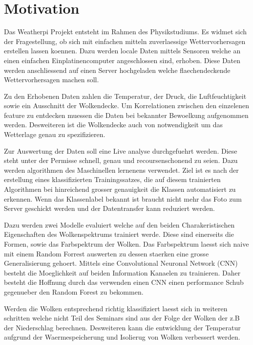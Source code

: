\section{Motivation}
\label{sec:Motivation}

Das Weatherpi Projekt entsteht im Rahmen des Physikstudiums.
Es widmet sich der Fragestellung, ob sich mit einfachen mitteln zuverlaessige
Wettervorhersagen erstellen lassen koennen.
Dazu werden locale Daten mittels Sensoren welche an einen einfachen Einplatinencomputer
angeschlossen sind, erhoben.
Diese Daten werden anschliessend auf einen Server hochgeladen welche
flaechendeckende Wettervorhersagen machen soll. \par
Zu den Erhobenen Daten zahlen die Temperatur, der Druck, die Luftfeuchtigkeit
sowie ein Ausschnitt der Wolkendecke.
Um Korrelationen zwischen den einzelenen feature zu entdecken muessen die Daten
bei bekannter Bewoelkung aufgenommen werden.
Desweiteren ist die Wolkendecke auch von notwendigkeit um das Wetterlage genau
zu spezifizieren.  \par
Zur Auswertung der Daten soll eine Live analyse durchgefuehrt werden. 
Diese steht unter der Permisse schnell, genau und recoursenschonend zu seien.
Dazu werden algorithmen des Maschinellen lernenens verwendet. 
Ziel ist es nach der erstellung eines klassifizierten Trainingssatzes, die auf
diesem trainierten Algorithmen bei hinreichend grosser genauigkeit die Klassen
automatisiert zu erkennen.
Wenn das Klassenlabel bekannt ist braucht nicht mehr das Foto zum Server
geschickt werden und der Datentransfer kann reduziert werden. \par
Dazu werden zwei Modelle evaluiert welche auf den beiden Charakeristischen
Eigenschaften des Wolkenspektrums trainiert werde. 
Diese sind einerseits die Formen, sowie das Farbspektrum der Wolken.
Das Farbspektrum laesst sich naive mit einem Random Forrest auswerten zu dessen
staerken eine grosse Generalisierung gehoert. 
Mittels eine Convolutional Neuronal Network (CNN) besteht die Moeglichkeit auf
beiden Information Kanaelen zu trainieren. 
Daher besteht die Hoffnung durch das verwenden einen CNN einen performance Schub
gegenueber den Random Forest zu bekommen. \par
Werden die Wolken entsprechend richtig klassifiziert laesst sich in weiteren
schritten welche nicht Teil des Seminars sind aus der Folge der Wolken der z.B
der Niederschlag berechnen. 
Desweiteren kann die entwicklung der Temperatur aufgrund der Waermespeicherung
und Isolierug von Wolken verbessert werden.

